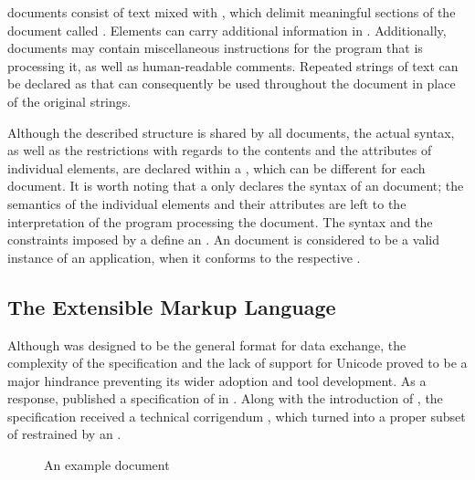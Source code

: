 \documentclass[
  a5paper,10pt,           %
  dvipsnames              %
]{book}
\begin{document}
 documents consist of text mixed with %
, which delimit meaningful sections of the document called
. Elements can carry additional
information in . Additionally,
 documents may contain miscellaneous instructions for the program
that is processing it, as well as human-readable comments. Repeated strings of
text can be declared as  
that can consequently be used throughout the document in place of the original
strings.

Although the described structure is shared by all  documents, the
actual syntax, as well as the restrictions with regards to the contents and the
attributes of individual elements, are declared within a , which
can be different for each document. It is worth noting that a  only
declares the syntax of an  document; the semantics of the
individual elements and their attributes are left to the interpretation of the
program processing the document. The syntax and the constraints imposed by a
 define an 
. An  document is considered to be a
valid instance of an  application, when it conforms to the
respective .

\subsection{The Extensible Markup Language}
Although  was designed to be the general format for data exchange,
the complexity of the specification and the lack of support for Unicode proved
to be a major hindrance preventing its wider adoption and tool development. As a
response,  published a specification of  in
\citeyear{bray98}. Along with the introduction of , the
 specification received a technical corrigendum
\cite{goldfarb97:webSGML}, which turned  into a proper subset of
 restrained by an  .

\begin{figure}
  \caption{An example  document}
  \label{fig:recipe}\bigskip
\end{figure}
\end{document}
